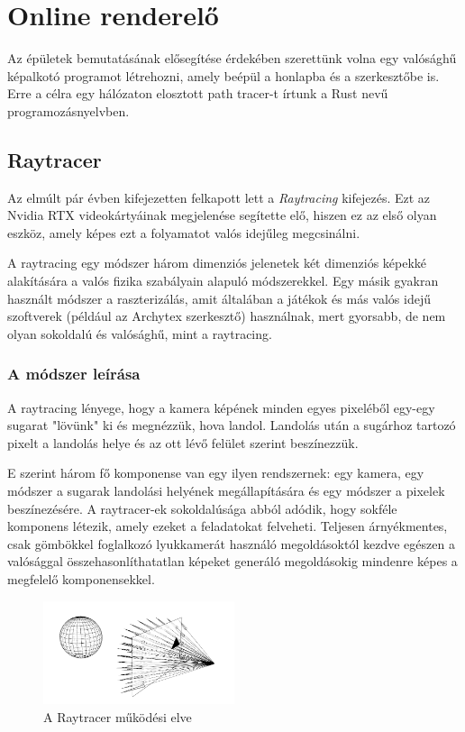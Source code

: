 \section{Online renderelő}
\label{raytracer}

Az épületek bemutatásának elősegítése érdekében szerettünk volna egy valósághű képalkotó programot létrehozni, amely beépül a honlapba és a szerkesztőbe is. Erre a célra egy hálózaton elosztott path tracer-t írtunk a Rust nevű programozásnyelvben.

\subsection{Raytracer}
Az elmúlt pár évben kifejezetten felkapott lett a \emph{Raytracing} kifejezés. Ezt az Nvidia RTX videokártyáinak megjelenése segítette elő, hiszen ez az első olyan eszköz, amely képes ezt a folyamatot valós idejűleg megcsinálni.

A raytracing egy módszer három dimenziós jelenetek két dimenziós képekké alakítására a valós fizika szabályain alapuló módszerekkel. Egy másik gyakran használt módszer a raszterizálás, amit általában a játékok és más valós idejű szoftverek (például az Archytex szerkesztő) használnak, mert gyorsabb, de nem olyan sokoldalú és valósághű, mint a raytracing.


\subsubsection{A módszer leírása}
A raytracing lényege, hogy a kamera képének minden egyes pixeléből egy-egy sugarat "lövünk" ki és megnézzük, hova landol. Landolás után a sugárhoz tartozó pixelt a landolás helye és az ott lévő felület szerint beszínezzük.

E szerint három fő komponense van egy ilyen rendszernek: egy kamera, egy módszer a sugarak landolási helyének megállapítására és egy módszer a pixelek beszínezésére. A raytracer-ek sokoldalúsága abból adódik, hogy sokféle komponens létezik, amely ezeket a feladatokat felveheti. Teljesen árnyékmentes, csak gömbökkel foglalkozó lyukkamerát használó megoldásoktól kezdve egészen a valósággal összehasonlíthatatlan képeket generáló megoldásokig mindenre képes a megfelelő komponensekkel.

\begin{figure}[H]
    \centering
    \includegraphics[width=0.5\textwidth]{parts/developer-documentation/ray-tracer/images/figure.png}
    \caption{A Raytracer működési elve}
\end{figure}
